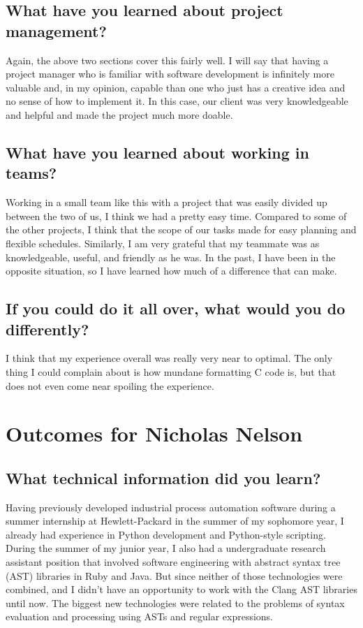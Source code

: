 \documentclass[11pt]{scrreprt}
\begin{document}
\subsection{What have you learned about project management?}

Again, the above two sections cover this fairly well.
I will say that having a project manager who is familiar with software development is infinitely more valuable and, in my opinion, capable than one who just has a creative idea and no sense of how to implement it.
In this case, our client was very knowledgeable and helpful and made the project much more doable.

\subsection{What have you learned about working in teams?}

Working in a small team like this with a project that was easily divided up between the two of us, I think we had a pretty easy time.
Compared to some of the other projects, I think that the scope of our tasks made for easy planning and flexible schedules.
Similarly, I am very grateful that my teammate was as knowledgeable, useful, and friendly as he was.
In the past, I have been in the opposite situation, so I have learned how much of a difference that can make.

\subsection{If you could do it all over, what would you do differently?}

I think that my experience overall was really very near to optimal.
The only thing I could complain about is how mundane formatting C code is, but that does not even come near spoiling the experience.


\section{Outcomes for Nicholas Nelson}

\subsection{What technical information did you learn?}

Having previously developed industrial process automation software during a summer internship at Hewlett-Packard in the summer of my sophomore year, I already had experience in Python development and Python-style scripting. During the summer of my junior year, I also had a undergraduate research assistant position that involved software engineering with abstract syntax tree (AST) libraries in Ruby and Java. But since neither of those technologies were combined, and I didn't have an opportunity to work with the Clang AST libraries until now.
The biggest new technologies were related to the problems of syntax evaluation and processing using ASTs and regular expressions.
\end{document}
